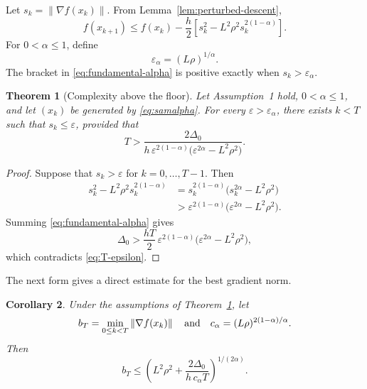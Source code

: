 \documentclass[11pt]{article}
\newtheorem{theorem}{Theorem}
\newtheorem{corollary}[theorem]{Corollary}
\theoremstyle{remark}
\newcommand{\norm}[1]{\left\lVert #1\right\rVert}
\begin{document}
Let $s_k=\norm{\nabla f(x_k)}$.  From Lemma~\ref{lem:perturbed-descent},
\begin{equation}\label{eq:fundamental-alpha}
 f(x_{k+1})
 \leq f(x_k)-\frac h2
 \left[s_k^2-L^2\rho^2s_k^{2(1-\alpha)}\right].
\end{equation}
For $0<\alpha\leq1$, define
\begin{equation}\label{eq:floor}
  \varepsilon_\alpha=(L\rho)^{1/\alpha}.
\end{equation}
The bracket in \eqref{eq:fundamental-alpha} is positive exactly when
$s_k>\varepsilon_\alpha$.

\begin{theorem}[Complexity above the floor]\label{thm:epsilon-complexity}
Let Assumption~1 hold, $0<\alpha\leq1$, and let $(x_k)$ be generated by
\eqref{eq:samalpha}.  For every
$\varepsilon>\varepsilon_\alpha$, there exists $k<T$ such that
$s_k\leq\varepsilon$, provided that
\begin{equation}\label{eq:T-epsilon}
 T>
 \frac{2\Delta_0}{
 h\,\varepsilon^{2(1-\alpha)}
 \bigl(\varepsilon^{2\alpha}-L^2\rho^2\bigr)}.
\end{equation}
\end{theorem}

\begin{proof}
Suppose that $s_k>\varepsilon$ for $k=0,\ldots,T-1$.  Then
\begin{align*}
s_k^2-L^2\rho^2s_k^{2(1-\alpha)}
&=s_k^{2(1-\alpha)}
  \bigl(s_k^{2\alpha}-L^2\rho^2\bigr)\\
&>\varepsilon^{2(1-\alpha)}
  \bigl(\varepsilon^{2\alpha}-L^2\rho^2\bigr).
\end{align*}
Summing \eqref{eq:fundamental-alpha} gives
$$
 \Delta_0>
 \frac{hT}{2}\,
 \varepsilon^{2(1-\alpha)}
 \bigl(\varepsilon^{2\alpha}-L^2\rho^2\bigr),
$$
which contradicts \eqref{eq:T-epsilon}.
\end{proof}

The next form gives a direct estimate for the best gradient norm.

\begin{corollary}\label{cor:best-gradient}
Under the assumptions of Theorem~\ref{thm:epsilon-complexity}, let
$$
  b_T=\min_{0\leq k<T}\norm{\nabla f(x_k)}
  \quad\hbox{and}\quad
  c_\alpha=(L\rho)^{2(1-\alpha)/\alpha}.
$$
Then
\begin{equation}\label{eq:best-gradient}
 b_T\leq
 \left(
 L^2\rho^2+\frac{2\Delta_0}{h\,c_\alpha T}
 \right)^{1/(2\alpha)}.
\end{equation}
\end{corollary}
\end{document}
